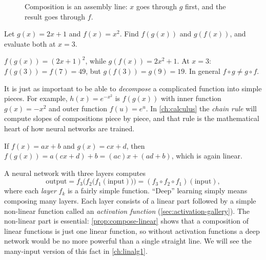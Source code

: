 \begin{figure}[htbp]
\centering
{}
\caption{Composition is an assembly line: $x$ goes through $g$ first, and the
  result goes through $f$.}
\label{fig:composition}
\end{figure}

\begin{example}\label{ex:composition}
Let $g(x) = 2x + 1$ and $f(x) = x^2$. Find $f(g(x))$ and $g(f(x))$, and
evaluate both at $x = 3$.

\sol $f(g(x)) = (2x+1)^2$, while $g(f(x)) = 2x^2 + 1$. At $x = 3$:
$f(g(3)) = f(7) = 49$, but $g(f(3)) = g(9) = 19$. In general
$f \circ g \neq g \circ f$.
\end{example}

It is just as important to be able to \emph{decompose} a complicated function
into simple pieces. For example, $h(x) = e^{-x^2}$ is $f(g(x))$ with inner
function $g(x) = -x^2$ and outer function $f(u) = e^u$. In \cref{ch:calculus}
the \emph{chain rule} will compute slopes of compositions piece by piece, and
that rule is the mathematical heart of how neural networks are trained.

\begin{proposition}
\label{prop:compose-linear}
If $f(x) = ax + b$ and $g(x) = cx + d$, then
$f(g(x)) = a(cx + d) + b = (ac)x + (ad + b)$, which is again linear.
\end{proposition}

\begin{mlnote}
A neural network with three layers computes
\[
  \text{output} = f_3\bigl(f_2\bigl(f_1(\text{input})\bigr)\bigr)
  = (f_3 \circ f_2 \circ f_1)(\text{input}),
\]
where each \emph{layer} $f_k$ is a fairly simple function. ``Deep'' learning
simply means composing many layers. Each layer consists of a linear part
followed by a simple non-linear function called an \emph{activation function}
(\cref{sec:activation-gallery}). The non-linear part is essential:
\cref{prop:compose-linear} shows that a composition of linear functions is
just one linear function, so without activation functions a deep network
would be no more powerful than a single straight line. We will see the
many-input version of this fact in \cref{ch:linalg1}.
\end{mlnote}

